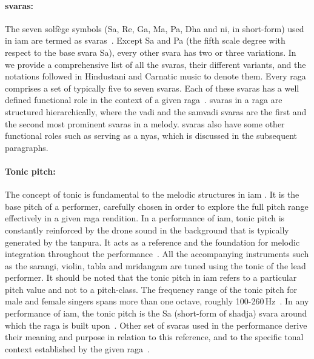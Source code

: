 \paragraph{\Glspl{svara}:} The seven solf\`{e}ge symbols (Sa, Re, Ga, Ma, Pa, Dha and \gls{ni}, in short-form) used in \gls{iam} are termed as \glspl{svara}~\citep{Danielou2010,Bagchee1998}. Except Sa and Pa (the fifth scale degree with respect to the base \gls{svara} Sa), every other \gls{svara} has two or three variations. In~ we provide a comprehensive list of all the \glspl{svara}, their different variants, and the notations followed in Hindustani and Carnatic music to denote them. Every \gls{raga} comprises a set of typically five to seven \glspl{svara}. Each of these \glspl{svara} has a well defined functional role in the context of a given \gls{raga}~\citep{Viswanathan2004}. \Glspl{svara} in a \gls{raga} are structured hierarchically, where the \gls{vadi} and the \gls{samvadi} \glspl{svara} are the first and the second most prominent \glspl{svara} in a melody. \Glspl{svara} also have some other functional roles such as serving as a \gls{nyas}, which is discussed in the subsequent paragraphs. 

\paragraph{Tonic pitch:} The concept of tonic is fundamental to the melodic structures in \gls{iam} \citep{Viswanathan2004,Danielou2010}. It is the base pitch of a performer, carefully chosen in order to explore the full pitch range effectively in a given \gls{raga} rendition. In a performance of \gls{iam}, tonic pitch is constantly reinforced by the drone sound in the background that is typically generated by the \gls{tanpura}. It acts as a reference and the foundation for melodic integration throughout the performance~\citep{Deva1980}. All the accompanying instruments such as the \gls{sarangi}, violin, \gls{tabla} and \gls{mridangam} are tuned using the tonic of the lead performer. It should be noted that the tonic pitch in \gls{iam} refers to a particular pitch value and not to a pitch-class. The frequency range of the tonic pitch for male and female singers spans more than one octave, roughly 100-260\,Hz~\citep{Sengupta2005b}. In any performance of \gls{iam}, the tonic pitch is the Sa (short-form of \gls{shadja}) \gls{svara} around which the \gls{raga} is built upon~\citep{Danielou2010,Bagchee1998}. Other set of \glspl{svara} used in the performance derive their meaning and purpose in relation to this reference, and to the specific tonal context established by the given \gls{raga}~\citep{Deva1980}. 

